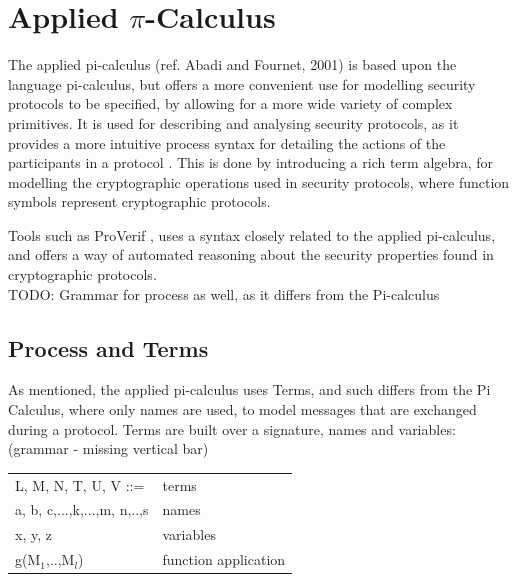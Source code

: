 \section{Applied $\pi$-Calculus}

The applied pi-calculus (ref. Abadi and Fournet, 2001) is based upon the language pi-calculus, but offers a more convenient use for modelling security protocols to be specified, by allowing for a more wide variety of complex primitives. It is used for describing and analysing security protocols, as it provides a more intuitive process syntax for detailing the actions of the participants in a protocol \autocite{AplliedPiCalsulus2010}. This is done by introducing a rich term algebra, for modelling the cryptographic operations used in security protocols, where function symbols represent cryptographic protocols. 

Tools such as ProVerif \autocite{ProVerif}, uses a syntax closely related to the applied pi-calculus, and offers a way of automated reasoning about the security properties found in cryptographic protocols. \\

TODO: Grammar for process as well, as it differs from the Pi-calculus

\subsection{Process and Terms}
As mentioned, the applied pi-calculus uses Terms, and such differs from the Pi Calculus, where only names are used, to model messages that are exchanged during a protocol. Terms are built over a signature, names and variables\autocite{AplliedPiCalsulus2010}: (grammar - missing vertical bar)\\
\begin{center}
	\begin{tabular} { l l }
 		L, M, N, T, U, V ::= & terms \\ 
 		a, b, c,...,k,...,m, n,..,s & names \\  
 		x, y, z & variables \\
 		g(M$_{1}$,..,M$_{l}$) & function application
	\end{tabular}
\end{center}


